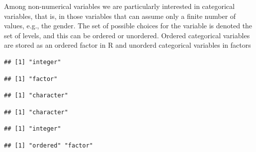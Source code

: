 Among non-numerical variables we are particularly interested in categorical variables, that is, in those variables that can assume only a finite number of values, e.g., the gender. The set of possible choices for the variable is denoted the set of levels, and this can be ordered or unordered. Ordered categorical variables are stored as an ordered factor in R and unorderd categorical variables in factors 
\begin{knitrout}
\color{fgcolor}\begin{kframe}
\begin{alltt}
 \hlkwb{<-} \hldef{(}\hldef{,} \hldef{)}
 \hlkwb{<-}     \hldef{=} \hldef{(}\hldef{,}\hldef{) )}
 \hlkwb{<-}   
\end{alltt}
\begin{verbatim}
## [1] "integer"
\end{verbatim}
\begin{alltt}
\end{alltt}
\begin{verbatim}
## [1] "factor"
\end{verbatim}
\begin{alltt}
\end{alltt}
\begin{verbatim}
## [1] "character"
\end{verbatim}
\begin{alltt}
\end{alltt}
\begin{verbatim}
## [1] "character"
\end{verbatim}
\begin{alltt}
 \hlkwb{<-} \hldef{(}\hldef{,} \hldef{,} \hldef{,} \hldef{)}
 \hlkwb{<-}   
 \hlkwb{<-}     
\end{alltt}
\begin{verbatim}
## [1] "integer"
\end{verbatim}
\begin{alltt}
\end{alltt}
\begin{verbatim}
## [1] "ordered" "factor"
\end{verbatim}
\end{kframe}
\end{knitrout}


